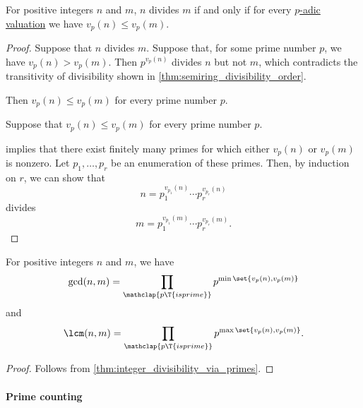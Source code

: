 \begin{corollary}\label{thm:integer_divisibility_via_primes}
  For positive integers \( n \) and \( m \), \( n \) divides \( m \) if and only if for every \hyperref[def:padic_valuation]{\( p \)-adic valuation} we have \( v_p(n) \leq v_p(m) \).
\end{corollary}
\begin{proof}
  \SufficiencySubProof Suppose that \( n \) divides \( m \). Suppose that, for some prime number \( p \), we have \( v_p(n) > v_p(m) \). Then \( p^{v_p(n)} \) divides \( n \) but not \( m \), which contradicts the transitivity of divisibility shown in \cref{thm:semiring_divisibility_order}.

  Then \( v_p(n) \leq v_p(m) \) for every prime number \( p \).

  \NecessitySubProof Suppose that \( v_p(n) \leq v_p(m) \) for every prime number \( p \).

   implies that there exist finitely many primes for which either \( v_p(n) \) or \( v_p(m) \) is nonzero. Let \( p_1, \ldots, p_r \) be an enumeration of these primes. Then, by induction on \( r \), we can show that
  \begin{equation*}
    n = p_1^{v_{p_1}(n)} \cdots p_r^{v_{p_r}(n)}
  \end{equation*}
  divides
  \begin{equation*}
    m = p_1^{v_{p_1}(m)} \cdots p_r^{v_{p_r}(m)}.
  \end{equation*}
\end{proof}

\begin{corollary}\label{thm:integer_gcd_lcm_via_primes}
  For positive integers \( n \) and \( m \), we have
  \begin{equation*}
    \gcd(n, m) = \prod_{\mathclap{p \T{is prime}}} p^{\min\set{ v_p(n), v_p(m) }}
  \end{equation*}
  and
  \begin{equation*}
    \lcm(n, m) = \prod_{\mathclap{p \T{is prime}}} p^{\max\set{ v_p(n), v_p(m) }}.
  \end{equation*}
\end{corollary}
\begin{proof}
  Follows from \cref{thm:integer_divisibility_via_primes}.
\end{proof}

\paragraph{Prime counting}

